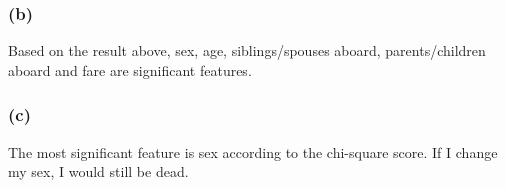 \documentclass{article}
\begin{document}
\subsubsection*{(b)}
	Based on the result above, sex, age, siblings/spouses aboard, parents/children aboard and fare are significant features.
	
\subsubsection*{(c)}
	The most significant feature is sex according to the chi-square score. If I change my sex, I would still be dead. 
	

\end{document}
